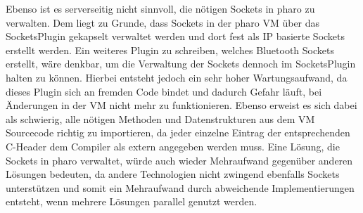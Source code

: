         Ebenso ist es serverseitig nicht sinnvoll, die nötigen Sockets in pharo zu verwalten. Dem liegt zu Grunde, dass Sockets in der pharo VM über das SocketsPlugin \cite{pharoSocket} gekapselt verwaltet werden und dort fest als IP basierte Sockets erstellt werden. Ein weiteres Plugin zu schreiben, welches Bluetooth Sockets erstellt, wäre denkbar, um die Verwaltung der Sockets dennoch im SocketsPlugin halten zu können. Hierbei entsteht jedoch ein sehr hoher Wartungsaufwand, da dieses Plugin sich an fremden Code bindet und dadurch Gefahr läuft, bei Änderungen in der VM nicht mehr zu funktionieren. Ebenso erweist es sich dabei als schwierig, alle nötigen Methoden und Datenstrukturen aus dem VM Sourcecode richtig zu importieren, da jeder einzelne Eintrag der entsprechenden C-Header dem Compiler als extern angegeben werden muss.
        Eine Lösung, die Sockets in pharo verwaltet, würde auch wieder Mehraufwand gegenüber anderen Lösungen bedeuten, da andere Technologien nicht zwingend ebenfalls Sockets unterstützen und somit ein Mehraufwand durch abweichende Implementierungen entsteht, wenn mehrere Lösungen parallel genutzt werden.
